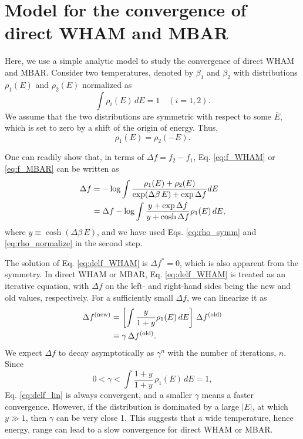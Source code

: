 \documentclass[reprint,aip,jcp,superscriptaddress]{revtex4-1}
\begin{document}
\section{\label{sec:convwham}
Model for the convergence of direct WHAM and MBAR}



Here, we use a simple analytic model
to study the convergence of direct WHAM and MBAR.
%
Consider two temperatures,
denoted by $\beta_1$ and $\beta_2$
with distributions $\rho_1(E)$ and $\rho_2(E)$
normalized as
%
\begin{equation}
\int \rho_i(E) \, dE
= 1
\quad
(i = 1, 2).
\label{eq:rho_normalize}
\end{equation}
%
We assume that the two distributions
are symmetric with respect to some $\bar E$,
which is set to zero
by a shift of the origin of energy.
%
Thus,
\begin{equation}
\rho_1(E)
=
\rho_2(-E).
\label{eq:rho_symm}
\end{equation}



One can readily show that,
in terms of $\Delta f = f_2 - f_1$,
Eq. \eqref{eq:f_WHAM} or \eqref{eq:f_MBAR}
can be written as
%
\begin{align}
\Delta f
&=
-\log \int
\frac{ \rho_1(E) + \rho_2(E) }
{ \exp(\Delta \beta \, E) + \exp \Delta f }
dE
\notag \\
&=
\Delta f
-
\log
  \int
    \frac{ y + \exp \Delta f }
         { y + \cosh \Delta f }
    \rho_1(E) \, dE,
\label{eq:delf_WHAM}
\end{align}
%
where $y \equiv \cosh(\Delta \beta \, E)$,
and we have used
Eqs. \eqref{eq:rho_symm} and
\eqref{eq:rho_normalize}
in the second step.



The solution of Eq. \eqref{eq:delf_WHAM}
is $\Delta f^* = 0$,
which is also apparent from the symmetry.
%
In direct WHAM or MBAR,
Eq. \eqref{eq:delf_WHAM}
is treated as an iterative equation,
with $\Delta f$
on the left- and right-hand sides
being the new and old values,
respectively.
%
For a sufficiently small $\Delta f$,
we can linearize it as
%
\begin{align}
\Delta f^\mathrm{(new)}
&=
\left[
  \int
    \frac{ y } { 1 + y }
    \rho_1(E) \, dE
\right] \,
\Delta f^\mathrm{(old)}
\notag\\
&\equiv
\gamma \,
\Delta f^\mathrm{(old)}.
\label{eq:delf_lin}
\end{align}
%
We expect
$\Delta f$
to decay asymptotically as $\gamma^n$
with the number of iterations, $n$.
%
Since
\[
0 < \gamma < \int
\frac{1 + y}
{1 + y}
\, \rho_1(E) \, dE = 1,
\]
Eq. \eqref{eq:delf_lin}
is always convergent,
and a smaller $\gamma$ means
a faster convergence.
%
However,
if the distribution
is dominated by a large $|E|$,
at which $y \gg 1$,
%
then $\gamma$
can be very close 1.
%
This suggests that
a wide temperature, hence energy, range
can lead to a slow convergence
for direct WHAM or MBAR.
\end{document}
